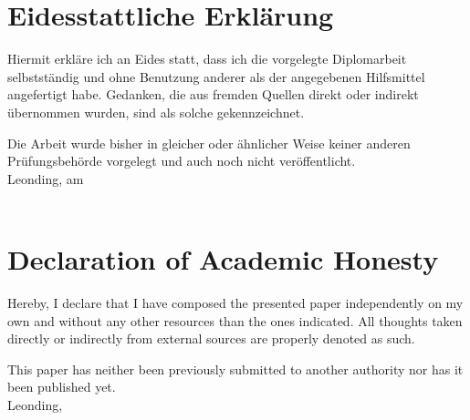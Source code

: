 \section*{Eidesstattliche Erklärung}
Hiermit erkläre ich an Eides statt, dass ich die vorgelegte Diplomarbeit selbstständig und ohne Benutzung anderer als der angegebenen Hilfsmittel angefertigt habe. Gedanken, die aus fremden Quellen direkt oder indirekt übernommen wurden, sind als solche gekennzeichnet.

Die Arbeit wurde bisher in gleicher oder ähnlicher Weise keiner anderen Prüfungsbehörde vorgelegt und auch noch nicht veröffentlicht. \\[1em]
Leonding, am \duedatede \\[5em]
\ifthenelse{\isundefined{\firstauthor}}{}{\firstauthor}
\ifthenelse{\isundefined{\secondauthor}}{}{\kern-1ex, \secondauthor}
\ifthenelse{\isundefined{\thirdauthor}}{}{\kern-1ex, \thirdauthor}
\ifthenelse{\isundefined{\fourthauthor}}{}{\kern-1ex, \fourthauthor} \\[5em]

\section*{Declaration of Academic Honesty}
Hereby, I declare that I have composed the presented paper independently on my own and without any other resources than the ones indicated. All thoughts taken directly or indirectly from external sources are properly denoted as such.

This paper has neither been previously submitted to another authority nor has it been published yet. \\[1em]
Leonding, \duedateen \\[5em]
\ifthenelse{\isundefined{\firstauthor}}{}{\firstauthor}
\ifthenelse{\isundefined{\secondauthor}}{}{\kern-1ex, \secondauthor}
\ifthenelse{\isundefined{\thirdauthor}}{}{\kern-1ex, \thirdauthor}
\ifthenelse{\isundefined{\fourthauthor}}{}{\kern-1ex, \fourthauthor} \\[5em]

